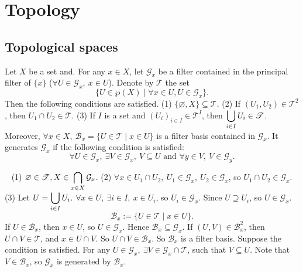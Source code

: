 \chapter{Topology}
\section{Topological spaces}
\begin{propositionenv}
    Let $X$ be a set and. For any $x\in X$, let $\mathcal{G}_x$ be a filter contained in the principal filter of $\{x\}$ ($\forall U\in \mathcal{G}_x,\ x\in U$). Denote by $\mathscr{T}$ the set 
    $$\{U\in \wp(X) \mid \forall x\in U, U\in\mathcal{G}_x\}.$$
    Then the following conditions are satisfied.
    \newline
    (1) $\{\varnothing, X\} \subseteq \mathscr{T}$.
    \newline
    (2) If $(U_1,U_2)\in \mathscr{T}^2$, then $U_1\cap U_2\in \mathscr{T}$.
    \newline
    (3) If $I$ is a set and $\left(U_i\right)_{i\in I}\in \mathscr{T}^I$, then $\displaystyle \bigcup_{i\in I}U_i\in \mathscr{T}$.
    \newline
    Moreover, $\forall x\in X,\ \mathcal{B}_x=\{U\in \mathscr{T}\mid x\in U\}$ is a filter basis contained in $\mathcal{G}_x$. It generates $\mathcal{G}_x$ if the following condition is satisfied:
    $$\forall U\in \mathcal{G}_x,\ \exists V\in \mathcal{G}_x,\ V\subseteq U \text{ and } \forall y\in V,\ V\in \mathcal{G}_y.$$
\end{propositionenv}
\begin{proofenv}
    \ \newline
    (1) $\displaystyle \varnothing \in \mathscr{T}, X\in \bigcap_{x\in X}\mathcal{G}_x$.
    \newline
    (2) $\forall x\in U_1\cap U_2,\ U_1\in \mathcal{G}_x,\ U_2\in \mathcal{G}_x$, so $U_1\cap U_2\in \mathcal{G}_x$.
    \newline
    (3) Let $\displaystyle U=\bigcup_{i\in I}U_i$. $\forall x\in U,\ \exists i\in I,\ x\in U_i$, so $U_i\in \mathcal{G}_x$. Since $U\supseteq U_i$, so $U\in\mathcal{G}_x$.
    $$\mathcal{B}_x:=\{U\in \mathscr{T}\mid x\in U\}.$$
    If $U\in \mathcal{B}_x$, then $x\in U$, so $U\in \mathcal{G}_x$. Hence $\mathcal{B}_x\subseteq\mathcal{G}_x$. If $(U,V)\in \mathcal{B}_x^2$, then $U\cap V\in \mathscr{T}$, and $x\in U\cap V$. So $U\cap V\in \mathcal{B}_x$. So $\mathcal{B}_x$ is a filter basis. Suppose the condition is satisfied. For any $U\in \mathcal{G}_x,\ \exists V\in \mathcal{G}_x\cap\mathscr{T}$, such that $V\subseteq U$. Note that $V\in \mathcal{B}_x$, so $\mathcal{G}_x$ is generated by $\mathcal{B}_x$.
\end{proofenv}
